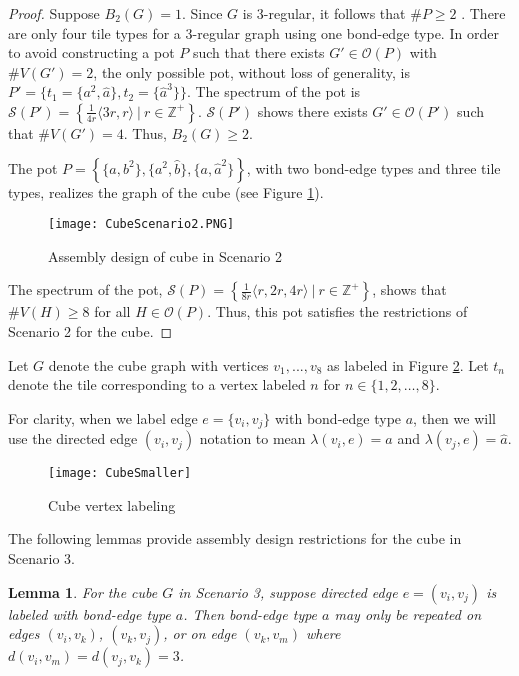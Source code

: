 \documentclass{elsarticle}
\newtheorem{lemma}[theorem]{Lemma}
\theoremstyle{definition}
\theoremstyle{remark}
\theoremstyle{plain}
\theoremstyle{plain}
\begin{document}
\begin{proof}
 Suppose $B_2(G)=1$. Since $G$ is 3-regular, it follows that $\# P \geq 2$ \cite{ellis2014minimal}. There are only four tile types for a 3-regular graph using one bond-edge type.  In order to avoid constructing a pot $P$ such that there exists $G' \in \mathcal{O}(P)$ with $\#V(G')=2$, the only possible pot, without loss of generality, is $P' = \{t_1=\{a^2,\hat{a}\}, t_2=\{\hat{a}^3\}\}$.  The  spectrum of the pot  is $\mathcal{S}(P') = \left\{\frac{1}{4r}\langle 3r, r \rangle \: | \: r \in \mathbb{Z}^+ \right\}$. $\mathcal{S}(P')$ shows there exists $G' \in \mathcal{O}(P')$ such that $\#V(G')=4$. Thus, $B_2(G) \geq 2$.  
 
 The pot $P=\left\{\{a,b^2\},\{a^2,\hat{b}\},\{a,\hat{a}^2\}\right\}$, with two bond-edge types and three tile types, realizes the graph of the cube (see Figure \ref{fig:Cube_scenario2}). 
 
 \begin{figure}[h]
 \centering
    \texttt{[image: CubeScenario2.PNG]}
     \caption{Assembly design of cube in Scenario 2}
     \label{fig:Cube_scenario2}
 \end{figure}
 
 The spectrum of the pot, $\mathcal{S}(P) = \left\{\frac{1}{8r} \langle r,  2r, 4r \rangle \: | \: r \in \mathbb{Z}^+ \right\}$, shows that $\#V(H) \geq 8$ for all $H \in \mathcal{O}(P).$ Thus, this pot satisfies the restrictions of Scenario 2 for the cube. 
 \end{proof}
 
 Let $G$ denote the cube graph with vertices $v_1,...,v_8$ as labeled in Figure \ref{fig:cubeVertices}. Let $t_n$ denote the tile corresponding to a vertex labeled $n$ for $n\in\{1, 2, \ldots, 8 \}$.   
 
For clarity, when we label edge $e = \{v_i,v_j\}$ with bond-edge type $a$, then we will use the directed edge $(v_i, v_j)$ notation to mean $\lambda(v_i, e) = a$ and $\lambda(v_j,e) = \hat{a}$. 

\begin{figure}[h]
	\centering
 \texttt{[image: CubeSmaller]}
      \caption{Cube vertex labeling}
      \label{fig:cubeVertices}
  \end{figure}

The following lemmas provide assembly design restrictions for the cube in Scenario 3. 

\begin{lemma}\label{lemma_CubeRestrictionRepeatBondType}
 For the cube $G$ in Scenario 3, suppose directed edge $e = (v_i, v_j)$ is labeled with bond-edge type $a$. Then bond-edge type $a$ may only be repeated on edges $(v_i, v_k)$, $(v_k, v_j)$, or on edge $(v_k, v_m)$ where $d(v_i,v_m) = d(v_j,v_k) = 3$.
\end{lemma}
\end{document}
